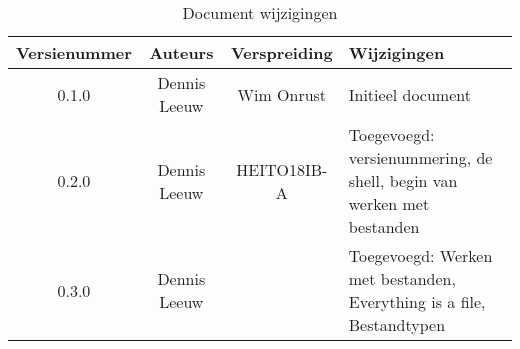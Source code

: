 \begin{flushleft}
\begin{table}[h!]
\centering
\begin{tabularx}{\textwidth}{ |c|c|c|X| }
\hline
	Versienummer &
	Auteurs &
	Verspreiding &
	Wijzigingen\\
\hline
	0.1.0 &
	Dennis Leeuw &
	Wim Onrust &
	Initieel document\\
\hline
	0.2.0 &
	Dennis Leeuw &
	HEITO18IB-A &
	Toegevoegd: versienummering, de shell, begin van werken met bestanden\\
\hline
	0.3.0 &
	Dennis Leeuw &
	&
	Toegevoegd: Werken met bestanden, Everything is a file, Bestandtypen\\
\hline
\end{tabularx}
\caption{Document wijzigingen}
\label{table:1}
\end{table}
\end{flushleft}

